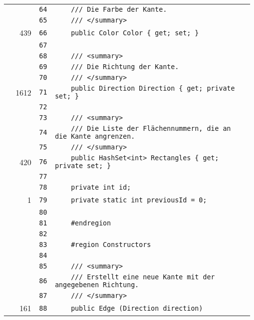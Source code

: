 \documentclass[a4paper,10pt]{article}
\begin{document}
\begin{longtable}[l]{lrrl}
\cellcolor{gray} &  & \verb~64~ & \verb~    /// Die Farbe der Kante.~\\
\cellcolor{gray} &  & \verb~65~ & \verb~    /// </summary>~\\
\cellcolor{green} & 439 & \verb~66~ & \verb~    public Color Color { get; set; }~\\
\cellcolor{gray} &  & \verb~67~ & \verb~~\\
\cellcolor{gray} &  & \verb~68~ & \verb~    /// <summary>~\\
\cellcolor{gray} &  & \verb~69~ & \verb~    /// Die Richtung der Kante.~\\
\cellcolor{gray} &  & \verb~70~ & \verb~    /// </summary>~\\
\cellcolor{green} & 1612 & \verb~71~ & \verb~    public Direction Direction { get; private set; }~\\
\cellcolor{gray} &  & \verb~72~ & \verb~~\\
\cellcolor{gray} &  & \verb~73~ & \verb~    /// <summary>~\\
\cellcolor{gray} &  & \verb~74~ & \verb~    /// Die Liste der Flächennummern, die an die Kante angrenzen.~\\
\cellcolor{gray} &  & \verb~75~ & \verb~    /// </summary>~\\
\cellcolor{green} & 420 & \verb~76~ & \verb~    public HashSet<int> Rectangles { get; private set; }~\\
\cellcolor{gray} &  & \verb~77~ & \verb~~\\
\cellcolor{gray} &  & \verb~78~ & \verb~    private int id;~\\
\cellcolor{green} & 1 & \verb~79~ & \verb~    private static int previousId = 0;~\\
\cellcolor{gray} &  & \verb~80~ & \verb~~\\
\cellcolor{gray} &  & \verb~81~ & \verb~    #endregion~\\
\cellcolor{gray} &  & \verb~82~ & \verb~~\\
\cellcolor{gray} &  & \verb~83~ & \verb~    #region Constructors~\\
\cellcolor{gray} &  & \verb~84~ & \verb~~\\
\cellcolor{gray} &  & \verb~85~ & \verb~    /// <summary>~\\
\cellcolor{gray} &  & \verb~86~ & \verb~    /// Erstellt eine neue Kante mit der angegebenen Richtung.~\\
\cellcolor{gray} &  & \verb~87~ & \verb~    /// </summary>~\\
\cellcolor{green} & 161 & \verb~88~ & \verb~    public Edge (Direction direction)~\\

\end{longtable}
\end{document}
